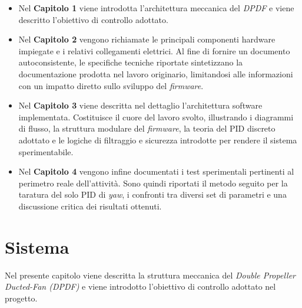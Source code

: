 \documentclass[11pt]{report}
\begin{document}
	\begin{itemize}
		\item Nel \textbf{Capitolo 1} viene introdotta l'architettura meccanica del \textit{DPDF} e viene descritto l'obiettivo di controllo adottato.
		\item Nel \textbf{Capitolo 2} vengono richiamate le principali componenti hardware impiegate e i relativi collegamenti elettrici. Al fine di fornire un documento autoconsistente, le specifiche tecniche riportate sintetizzano la documentazione prodotta nel lavoro originario, limitandosi alle informazioni con un impatto diretto sullo sviluppo del \textit{firmware}.
		\item Nel \textbf{Capitolo 3} viene descritta nel dettaglio l'architettura software implementata. Costituisce il cuore del lavoro svolto, illustrando i diagrammi di flusso, la struttura modulare del \textit{firmware}, la teoria del PID discreto adottato e le logiche di filtraggio e sicurezza introdotte per rendere il sistema sperimentabile.
		\item Nel \textbf{Capitolo 4} vengono infine documentati i test sperimentali pertinenti al perimetro reale dell'attività. Sono quindi riportati il metodo seguito per la taratura del solo PID di \textit{yaw}, i confronti tra diversi set di parametri e una discussione critica dei risultati ottenuti.
	\end{itemize}
	\newpage
	\chapter{Sistema}
	Nel presente capitolo viene descritta la struttura meccanica del \textit{Double Propeller Ducted-Fan (DPDF)} e viene introdotto l'obiettivo di controllo adottato nel progetto.
	
\end{document}
